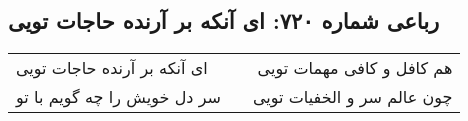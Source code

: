 \begin{center}
\section*{رباعی شماره ۷۲۰: ای آنکه بر آرنده حاجات تویی}
\label{sec:sh720}
\begin{longtable}{l p{0.5cm} r}
ای آنکه بر آرنده حاجات تویی
&&
هم کافل و کافی مهمات تویی
\\
سر دل خویش را چه گویم با تو
&&
چون عالم سر و الخفیات تویی
\\
\end{longtable}
\end{center}
